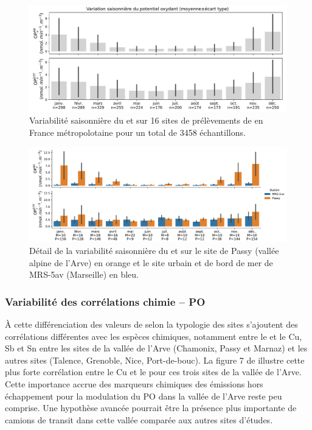 \begin{figure}[ht]
    \centering
    \includegraphics[width=1.0\linewidth]{figures/chapter04/variabilite_saisonniere.pdf}
    \caption{Variabilité saisonnière du \POAAv{} et \PODTTv{} sur 16 sites de prélèvements
        de \PMdix{} en France métropolotaine pour un total de 3458 échantillons.
    }%
    \label{fig:variabilite_saisonniere}
\end{figure}


\begin{figure}[ht]
    \centering
    \includegraphics[width=1.0\linewidth]{figures/chapter04/variabilite_saisonniere_MRS-Passy.pdf}
    \caption{Détail de la variabilité saisonnière du \POAAv{} et \PODTTv{} sur le site de
        Passy (vallée alpine de l'Arve) en orange et le site urbain et de bord de mer de MRS-5av
        (Marseille) en bleu.
    }%
    \label{fig:variabilite_saisonniere_MRS_PASSY}
\end{figure}

\subsubsection{Variabilité des corrélations chimie -- PO}%
\label{ssub:_variabilité_des_corrélations_chimie_po}

À cette différenciation des valeurs de \POv{} selon la typologie des sites s'ajoutent des
corrélations différentes avec les espèces chimiques, notamment entre le \POAAv{} et le
Cu, Sb et Sn entre les sites de la vallée de l'Arve (Chamonix, Passy et Marnaz) et les
autres sites (Talence, Grenoble, Nice, Port-de-bouc). La figure 7 de
\cite{calasSeasonal2019} illustre cette plus forte corrélation entre le Cu et le \POAAv{}
pour ces trois sites de la vallée de l'Arve. Cette importance accrue des marqueurs chimiques des
émissions hors échappement pour la modulation du PO dans la vallée de l'Arve reste peu
comprise. Une hypothèse avancée pourrait être la présence plus importante de camions de
transit dans cette vallée comparée aux autres sites d'études.

